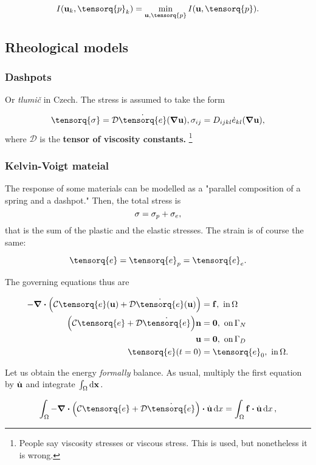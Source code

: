 \documentclass[reqno, a4paper]{article}
\begin{document}
\[
	I\qty(\vb{u}_k, \tensorq{p}_k) = \min_{\vb{u}, \tensorq{p}} I\qty(\vb{u},\tensorq{p}).
\]


\subsection{Rheological models}
\label{sec:rheology}

\subsubsection{Dashpots}
\label{sec:dashpot}
Or \textit{tlumič} in Czech. The stress is assumed to take the form

\[
	\tensorq{\sigma} = \mathcal{D}\dot{\tensorq{e}}\qty(\grad \vb{u}), \sigma_{ij} = D_{ijkl}\dot{e}_{kl}\qty(\grad \vb{u}),
\]
where $\mathcal{D}$ is the \textbf{tensor of viscosity constants.} \footnote{People say viscosity stresses or viscous stress. This is used, but nonetheless it is wrong.}

\subsubsection{Kelvin-Voigt mateial}
\label{sec:kelvin-voigt}
The response of some materials can be modelled as a "parallel composition of a spring and a dashpot." Then, the total stress is
\[
	\mathbb{\sigma} = \mathbb{\sigma}_{p} + \mathbb{\sigma}_{e},
\]
that is the sum of the plastic and the elastic stresses. The strain is of course the same:

\[
	\tensorq{e} = \tensorq{e}_{p} = \tensorq{e}_{e}.
\]

The governing equations thus are

\begin{align*}
	- \divergence{\qty(\mathcal{C} \tensorq{e}\qty(\vb{u})+ \mathcal{D}\dot{\tensorq{e}}\qty(\vb{u}))} &= \vb{f}, \, \, \text{in} \,\Omega\\
	\qty(\mathcal{C}\tensorq{e}+ \mathcal{D} \dot{\tensorq{e}})\vb{n} &= \vb{0}, \, \, \text{on} \, \Gamma_{N}\\
	\vb{u} &= \vb{0}, \, \, \text{on} \,\Gamma_D \\
	\tensorq{e}\qty(t = 0) &= \tensorq{e}_0, \, \, \text{in} \, \Omega.
\end{align*}

Let us obtain the energy \textit{formally} balance. As usual, multiply the first equation by $\dot{\vb{u}}$ and integrate $\int_{\Omega}\dd{\vb{x}}.$

\[
	\int_{\Omega}- \divergence{\qty(\mathcal{C}\tensorq{e}+ \mathcal{D}\dot{\tensorq{e}})} \vdot \dot{\vb{u}}\dd{x} = \int_{\Omega}\vb{f} \vdot \dot{\vb{u}}\dd{x},
\]
\end{document}
